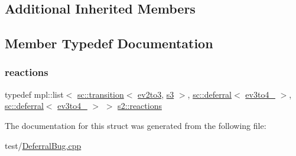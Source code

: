 \subsection*{Additional Inherited Members}


\subsection{Member Typedef Documentation}
\mbox{\label{structs2_a4368425590a18559700f7db59bca5e39}} 
\subsubsection{\texorpdfstring{reactions}{reactions}}
{\footnotesize\ttfamily typedef mpl\+::list$<$ \mbox{\hyperlink{classboost_1_1statechart_1_1transition}{sc\+::transition}}$<$ \mbox{\hyperlink{structev2to3}{ev2to3}}, \mbox{\hyperlink{structs3}{s3}} $>$, \mbox{\hyperlink{classboost_1_1statechart_1_1deferral}{sc\+::deferral}}$<$ \mbox{\hyperlink{structev3to4__1}{ev3to4\+\_}} $>$, \mbox{\hyperlink{classboost_1_1statechart_1_1deferral}{sc\+::deferral}}$<$ \mbox{\hyperlink{structev3to4__2}{ev3to4\+\_}} $>$ $>$ \mbox{\hyperlink{structs2_a4368425590a18559700f7db59bca5e39}{s2\+::reactions}}}



The documentation for this struct was generated from the following file\+:\begin{DoxyCompactItemize}
\item 
test/\mbox{\hyperlink{_deferral_bug_8cpp}{Deferral\+Bug.\+cpp}}\end{DoxyCompactItemize}
